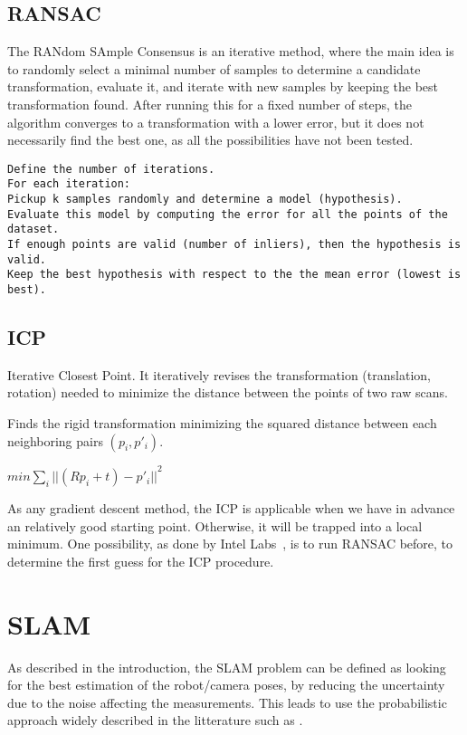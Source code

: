 \subsection{RANSAC}
The RANdom SAmple Consensus is an iterative method, where the main idea is to randomly select a minimal number of samples to determine a candidate transformation, evaluate it, and iterate with new samples by keeping the best transformation found. After running this for a fixed number of steps, the algorithm converges to a transformation with a lower error, but it does not necessarily find the best one, as all the possibilities have not been tested.

\begin{verbatim}
Define the number of iterations.
For each iteration:
Pickup k samples randomly and determine a model (hypothesis).
Evaluate this model by computing the error for all the points of the dataset.
If enough points are valid (number of inliers), then the hypothesis is valid.
Keep the best hypothesis with respect to the the mean error (lowest is best).
\end{verbatim}

\subsection{ICP}
Iterative Closest Point.
It iteratively revises the transformation (translation, rotation) needed to minimize the distance between the points of two raw scans.

Finds the rigid transformation minimizing the squared distance between each neighboring pairs $(p_{i}, p'_{i})$.

$min \sum_{i}{||(Rp_{i}+t)-p'_{i}||}^2$

As any gradient descent method, the ICP is applicable when we have in advance an relatively good starting point. Otherwise, it will be trapped into a local minimum. One possibility, as done by Intel Labs~\cite{Intel_RGBD_2010}, is to run RANSAC before, to determine the first guess for the ICP procedure.

\section{SLAM}

As described in the introduction, the SLAM problem can be defined as looking for the best estimation of the robot/camera poses, by reducing the uncertainty due to the noise affecting the measurements. This leads to use the probabilistic approach widely described in the litterature such as \cite{Thrun_2005}.

